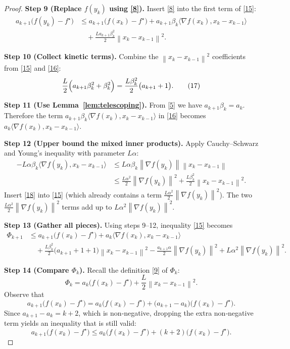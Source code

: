 \documentclass{article}
\newcommand{\norm}[1]{\left\lVert#1\right\rVert}
\newcommand{\grad}{\nabla}
\begin{document}
\begin{proof}
\textbf{Step 9 (Replace $f(y_k)$ using \eqref{8}).}
Insert \eqref{8} into the first term of \eqref{15}:
\[
\begin{aligned}
a_{k+1}\bigl(f(y_k)-f^\star\bigr)
&\le a_{k+1}\bigl(f(x_k)-f^\star\bigr)
+ a_{k+1}\beta_k\langle\grad f(x_k),x_k-x_{k-1}\rangle\\
&\quad +\frac{L a_{k+1}\beta_k^{2}}{2}\norm{x_k-x_{k-1}}^{2}.
\end{aligned}
\tag{16}
\]

\textbf{Step 10 (Collect kinetic terms).}
Combine the $\norm{x_k-x_{k-1}}^{2}$ coefficients from \eqref{15} and \eqref{16}:
\[
\frac{L}{2}\Bigl(a_{k+1}\beta_k^{2}+\beta_k^{2}\Bigr)
= \frac{L\beta_k^{2}}{2}\bigl(a_{k+1}+1\bigr).
\tag{17}
\]

\textbf{Step 11 (Use Lemma~\ref{lem:telescoping}).}
From \eqref{5} we have $a_{k+1}\beta_k = a_k$.  Therefore the term
$a_{k+1}\beta_k\langle\grad f(x_k),x_k-x_{k-1}\rangle$ in \eqref{16}
becomes $a_k\langle\grad f(x_k),x_k-x_{k-1}\rangle$.

\textbf{Step 12 (Upper bound the mixed inner products).}
Apply Cauchy–Schwarz and Young’s inequality with parameter $L\alpha$:
\[
\begin{aligned}
-L\alpha\beta_k\langle\grad f(y_k),x_k-x_{k-1}\rangle
&\le L\alpha\beta_k\norm{\grad f(y_k)}\norm{x_k-x_{k-1}}\\
&\le \frac{L\alpha^{2}}{2}\norm{\grad f(y_k)}^{2}
+\frac{L\beta_k^{2}}{2}\norm{x_k-x_{k-1}}^{2}.
\end{aligned}
\tag{18}
\]
Insert \eqref{18} into \eqref{15} (which already contains a term
$\frac{L\alpha^{2}}{2}\norm{\grad f(y_k)}^{2}$).  The two
$\frac{L\alpha^{2}}{2}\norm{\grad f(y_k)}^{2}$ terms add up to $L\alpha^{2}\norm{\grad f(y_k)}^{2}$.

\textbf{Step 13 (Gather all pieces).}
Using steps 9–12, inequality \eqref{15} becomes
\[
\begin{aligned}
\Phi_{k+1}
&\le a_{k+1}\bigl(f(x_k)-f^\star\bigr)
+ a_k\langle\grad f(x_k),x_k-x_{k-1}\rangle\\
&\quad +\frac{L\beta_k^{2}}{2}\bigl(a_{k+1}+1+1\bigr)\norm{x_k-x_{k-1}}^{2}
-\frac{a_{k+1}\alpha}{2}\norm{\grad f(y_k)}^{2}
+L\alpha^{2}\norm{\grad f(y_k)}^{2}.
\end{aligned}
\tag{19}
\]

\textbf{Step 14 (Compare $\Phi_k$).}
Recall the definition \eqref{9} of $\Phi_k$:
\[
\Phi_k = a_k\bigl(f(x_k)-f^\star\bigr)+\frac{L}{2}\norm{x_k-x_{k-1}}^{2}.
\tag{20}
\]
Observe that
\[
a_{k+1}\bigl(f(x_k)-f^\star\bigr)
= a_k\bigl(f(x_k)-f^\star\bigr)+\bigl(a_{k+1}-a_k\bigr)\bigl(f(x_k)-f^\star\bigr).
\tag{21}
\]
Since $a_{k+1}-a_k = k+2$, which is non‑negative, dropping the extra non‑negative
term yields an inequality that is still valid:
\[
a_{k+1}\bigl(f(x_k)-f^\star\bigr)\le a_k\bigl(f(x_k)-f^\star\bigr)
+ (k+2)\bigl(f(x_k)-f^\star\bigr).
\tag{22}
\]


\end{proof}
\end{document}
